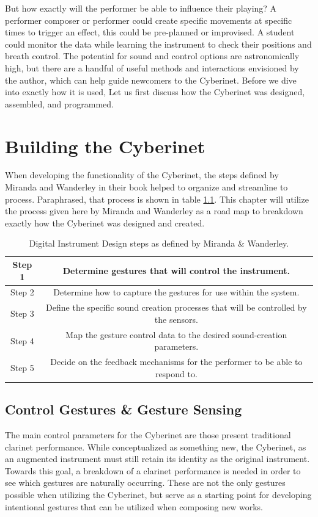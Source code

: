 But how exactly will the performer be able to influence their playing? A performer composer or performer could create specific movements at specific times to trigger an effect, this could be pre-planned or improvised. A student could monitor the data while learning the instrument to check their positions and breath control. The potential for sound and control options are astronomically high, but there are a handful of useful methods and interactions envisioned by the author, which can help guide newcomers to the Cyberinet. Before we dive into exactly how it is used, Let us first discuss how the Cyberinet was designed, assembled, and programmed.


\chapter{Building the Cyberinet}
When developing the functionality of the Cyberinet, the steps defined by Miranda and Wanderley in their book\cite{miranda_Wanderley_instrumentControl_2006} helped to organize and streamline to process. Paraphrased, that process is shown in table \ref{fig:DMIProcess}. This chapter will utilize the process given here by Miranda and Wanderley as a road map to breakdown exactly how the Cyberinet was designed and created.

\begin{table}[]
    \centering
    \begin{tabular}{|c||c|}
    \hline
     Step 1    & Determine gestures that will control the instrument. \\
     \hline
     Step 2    & Determine how to capture the gestures for use within the system. \\
     \hline
     Step 3    & Define the specific sound creation processes that will be controlled by the sensors. \\\hline
     Step 4    &  Map the gesture control data to the desired sound-creation parameters.  \\
     \hline
     Step 5    &  Decide on the feedback mechanisms for the performer to be able to respond to.\\
     \hline
    \end{tabular}
    \caption{Digital Instrument Design steps as defined by Miranda \& Wanderley\cite{miranda_Wanderley_instrumentControl_2006}.}
    \label{fig:DMIProcess}
\end{table}


\section{Control Gestures \& Gesture Sensing}
The main control parameters for the Cyberinet are those present traditional clarinet performance. While conceptualized as something new, the Cyberinet, as an augmented instrument must still retain its identity as the original instrument\cite{miranda_Wanderley_instrumentControl_2006}. Towards this goal, a breakdown of a clarinet performance is needed in order to see which gestures are naturally occurring. These are not the only gestures possible when utilizing the Cyberinet, but serve as a starting point for developing intentional gestures that can be utilized when composing new works.

